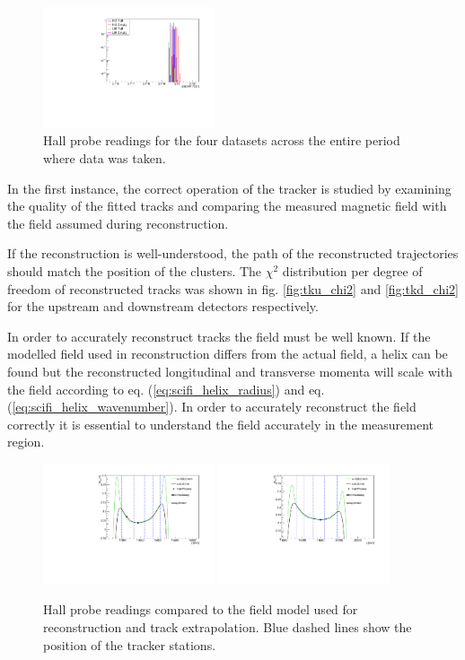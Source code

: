 \begin{figure}[!tbh]
    \includegraphics*[width=0.45\textwidth]{03-Detectors/Figures/hall-probes_2017-02-7/hp_72.pdf}
    \caption{Hall probe readings for the four datasets across the entire period 
             where data was taken.\label{fig:hall_probes}}
\end{figure}

In the first instance, the correct operation of the tracker is studied by
examining the quality of the fitted tracks and comparing the measured magnetic 
field with the field assumed during reconstruction.

If the reconstruction is well-understood, the path of the reconstructed 
trajectories should match the position of the clusters. The $\chi^2$ distribution
per degree of freedom of reconstructed tracks was shown in fig. 
\ref{fig:tku_chi2} and \ref{fig:tkd_chi2} for the upstream and downstream
detectors respectively.

In order to accurately reconstruct tracks the field must be well known. If the
modelled field used in reconstruction differs from the actual field, a helix
can be found but the reconstructed longitudinal and transverse momenta will 
scale with the field according to eq. (\ref{eq:scifi_helix_radius}) and eq. 
(\ref{eq:scifi_helix_wavenumber}). In order to accurately reconstruct the field 
correctly it is essential to understand the field accurately in the measurement
region.

\begin{figure}[!tbh]
    \centering
    \includegraphics*[width=0.45\textwidth]{03-Detectors/Figures/field_2017-02-7/bfield_vs_z_ssu}
    \includegraphics*[width=0.45\textwidth]{03-Detectors/Figures/field_2017-02-7/bfield_vs_z_ssd}
    \caption{Hall probe readings compared to the field model used for 
             reconstruction and track extrapolation. Blue dashed lines show the
             position of the tracker stations.\label{fig:field_map}}
\end{figure}

